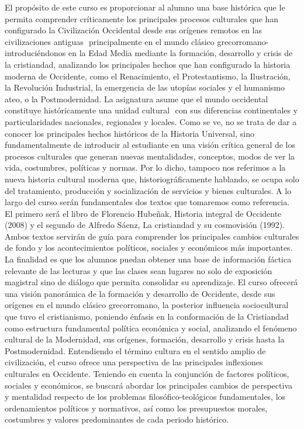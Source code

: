 \begin{syllabus}


\begin{justification}
El propósito de este curso es proporcionar al alumno una base histórica que le permita comprender críticamente los principales procesos culturales que han configurado la Civilización Occidental desde sus orígenes remotos en las civilizaciones antiguas  principalmente en el mundo clásico grecorromano- introduciéndonos en la Edad Media mediante la formación, desarrollo y crisis de la cristiandad,  analizando los principales hechos que han configurado la historia moderna de Occidente, como el Renacimiento, el Protestantismo, la Ilustración, la Revolución Industrial, la emergencia de las utopías sociales y el humanismo ateo, o la Postmodernidad.
La asignatura asume que el mundo occidental constituye históricamente una unidad cultural  con sus diferencias continentales y particularidades nacionales, regionales y locales.
Como se ve, no se trata de dar a conocer los principales hechos históricos de la Historia Universal,  sino fundamentalmente de introducir al estudiante en una visión crítica general de los procesos culturales que generan nuevas mentalidades, conceptos, modos de ver la vida, costumbres, políticas y normas. Por lo dicho, tampoco nos referimos a la nueva historia cultural moderna que, historiográficamente hablando, se ocupa solo del tratamiento, producción y socialización de servicios y bienes culturales.
A lo largo del curso serán fundamentales dos textos que tomaremos como referencia. El primero será el libro de Florencio Hubeñak, Historia integral de Occidente (2008) y el segundo de Alfredo Sáenz, La cristiandad y su cosmovisión (1992). Ambos textos servirán de guía para comprender los principales cambios culturales de fondo y los acontecimientos políticos, sociales y económicos más importantes.
La finalidad es que los alumnos puedan obtener una base de información fáctica relevante de las lecturas y que las clases sean lugares no solo de exposición magistral sino de diálogo que permita consolidar su aprendizaje.
El curso ofrecerá una visión panorámica de la formación y desarrollo de Occidente, desde sus orígenes en el mundo clásico grecorromano, la posterior influencia sociocultural que tuvo el cristianismo, poniendo énfasis en la conformación de la Cristiandad como estructura fundamental política económica y social, analizando el fenómeno cultural de la Modernidad, sus orígenes, formación, desarrollo y crisis hasta la Postmodernidad.  Entendiendo el término cultura en el sentido amplio de civilización, el curso ofrece una perspectiva de las principales inflexiones culturales en Occidente.
Teniendo en cuenta la conjunción de factores políticos, sociales y económicos, se buscará abordar los principales cambios de perspectiva y mentalidad respecto de los problemas filosófico-teológicos fundamentales, los ordenamientos políticos y normativos, así como los presupuestos morales, costumbres y valores predominantes de cada periodo histórico.
\end{justification}


\end{syllabus}
